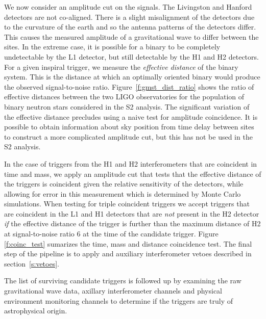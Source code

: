 We now consider an amplitude cut on the signals. The Livingston and Hanford
detectors are not co-aligned. There is a slight misalignment of the detectors
due to the curvature of the earth and so the antenna patterns of the detectors
differ. This causes the measured amplitude of a gravitational wave to differ
between the sites. In the extreme case, it is possible for a binary to be
completely undetectable by the L1 detector, but still detectable by the H1 and
H2 detectors. For a given inspiral trigger, we measure the \emph{effective
distance} of the binary system. This is the distance at which an optimally
oriented binary would produce the observed signal-to-noise ratio.
Figure~\ref{f:gmst_dist_ratio} shows the ratio of effective distances between
the two LIGO observatories for the population of binary neutron stars
considered in the S2 analysis. The significant variation of the effective
distance precludes using a naive test for amplitude coincidence. It is
possible to obtain information about sky position from time delay between
sites to construct a more complicated amplitude cut, but this has not be used
in the S2 analysis.

In the case of triggers from the H1 and H2 interferometers that are coincident
in time and mass, we apply an amplitude cut that tests that the effective
distance of the triggers is coincident given the relative sensitivity of the
detectors, while allowing for error in this measurement which is determined by
Monte Carlo simulations.  When testing for triple coincident triggers we 
accept triggers that are coincident in the L1 and H1 detectors that are
\emph{not} present in the H2 detector \emph{if} the effective distance of the
trigger is further than the maximum distance of H2 at signal-to-noise ratio
$6$ at the time of the candidate trigger. Figure \ref{f:coinc_test} sumarizes
the time, mass and distance coincidence test.  The final step of the pipeline
is to apply and auxiliary interferometer vetoes described in
section~\ref{s:vetoes}. 

The list of surviving candidate triggers is followed up by examining the raw
gravitational wave data, axillary interferometer channels and physical
environment monitoring channels to determine if the triggers are truly of
astrophysical origin.

